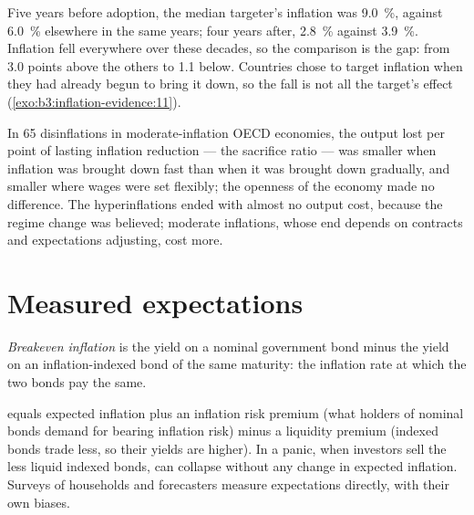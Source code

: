 Five years before adoption, the median targeter's inflation was 9.0~\%, against 6.0~\%
elsewhere in the same years; four years after, 2.8~\% against 3.9~\%. Inflation fell
everywhere over these decades, so the comparison is the gap: from 3.0 points above
the others to 1.1 below. Countries chose to target inflation when they had already
begun to bring it down, so the fall is not all the target's effect
(\cref{exo:b3:inflation-evidence:11}). %

\begin{record}
In 65 disinflations in moderate-inflation OECD economies, the output lost per point
of lasting inflation reduction --- the sacrifice ratio --- was smaller when
inflation was brought down fast than when it was brought down gradually, and
smaller where wages were set flexibly; the openness of the economy made no
difference. %
The hyperinflations ended with almost no output cost, because the regime change was
believed; moderate inflations, whose end depends on contracts and expectations
adjusting, cost more.
\end{record}

\section{Measured expectations}\label{sec:b3:inflation-evidence:expectations}

\begin{definition}\label{def:b3:inflation-evidence:breakeven}
\emph{Breakeven inflation} is the yield on a nominal government bond minus the yield
on an inflation-indexed bond of the same maturity: the inflation rate at which the
two bonds pay the same.
\end{definition}

\begin{measure}
 equals expected inflation plus an inflation risk premium (what
holders of nominal bonds demand for bearing inflation risk) minus a liquidity
premium (indexed bonds trade less, so their yields are higher). In a panic, when
investors sell the less liquid indexed bonds,  can collapse
without any change in expected inflation. Surveys of households and forecasters
measure expectations directly, with their own biases.
\end{measure}

